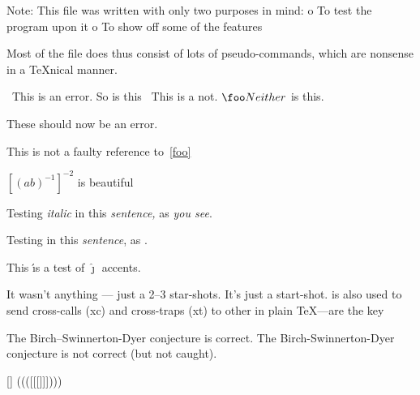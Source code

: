 Note: This file was written with only two purposes in mind:
    o To test the program upon it
    o To show off some of the features

Most of the file does thus consist of lots of pseudo-commands, which
are nonsense in a TeXnical manner.



\foo\ This is an error.
So is this \foo\
\smallskip This is a not. $\foo Neither$ is this.

\startsection[title={Testing ConTeXt}]
These should now be an error.
\stopsection


This is not a faulty reference to~\ref{foo}


${{[{(ab)}^{-1}]}}^{-2}$ is beautiful


Testing {\it italic\/} in this {\em sentence,} as {\em you see}.


Testing \textem{italic} in this \textit{sentence}, as \textem{you see}.


This \'{\i}s a test of $\hat{\jmath}$ accents.


It wasn't anything --- just a 2--3 star-shots.
It's just a start-shot.
is also used to send cross-calls (xc) and cross-traps (xt) to other
in plain TeX---are the key

The Birch--Swinnerton-Dyer conjecture is correct.
The Birch-Swinnerton-Dyer conjecture is not correct (but not caught).



{[]} ((([[[{{{}}}]]])))


